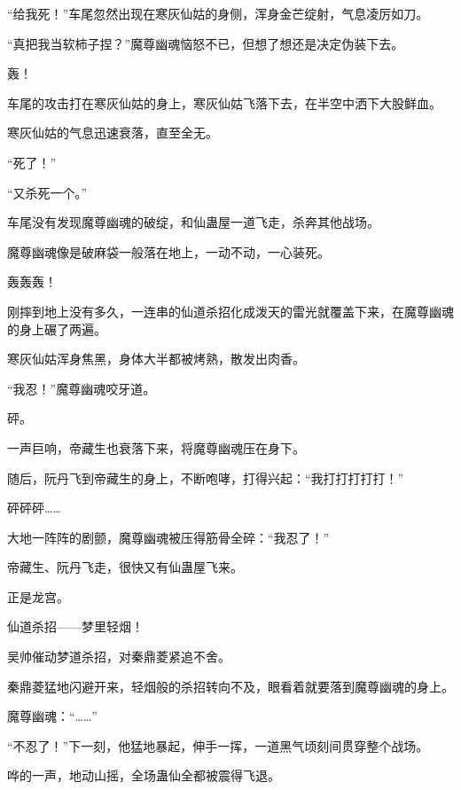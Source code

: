 \begin{this_body}
“给我死！”车尾忽然出现在寒灰仙姑的身侧，浑身金芒绽射，气息凌厉如刀。

“真把我当软柿子捏？”魔尊幽魂恼怒不已，但想了想还是决定伪装下去。

轰！

车尾的攻击打在寒灰仙姑的身上，寒灰仙姑飞落下去，在半空中洒下大股鲜血。

寒灰仙姑的气息迅速衰落，直至全无。

“死了！”

“又杀死一个。”

车尾没有发现魔尊幽魂的破绽，和仙蛊屋一道飞走，杀奔其他战场。

魔尊幽魂像是破麻袋一般落在地上，一动不动，一心装死。

轰轰轰！

刚摔到地上没有多久，一连串的仙道杀招化成泼天的雷光就覆盖下来，在魔尊幽魂的身上碾了两遍。

寒灰仙姑浑身焦黑，身体大半都被烤熟，散发出肉香。

“我忍！”魔尊幽魂咬牙道。

砰。

一声巨响，帝藏生也衰落下来，将魔尊幽魂压在身下。

随后，阮丹飞到帝藏生的身上，不断咆哮，打得兴起：“我打打打打打！”

砰砰砰……

大地一阵阵的剧颤，魔尊幽魂被压得筋骨全碎：“我忍了！”

帝藏生、阮丹飞走，很快又有仙蛊屋飞来。

正是龙宫。

仙道杀招——梦里轻烟！

吴帅催动梦道杀招，对秦鼎菱紧追不舍。

秦鼎菱猛地闪避开来，轻烟般的杀招转向不及，眼看着就要落到魔尊幽魂的身上。

魔尊幽魂：“……”

“不忍了！”下一刻，他猛地暴起，伸手一挥，一道黑气顷刻间贯穿整个战场。

哗的一声，地动山摇，全场蛊仙全都被震得飞退。

\end{this_body}

